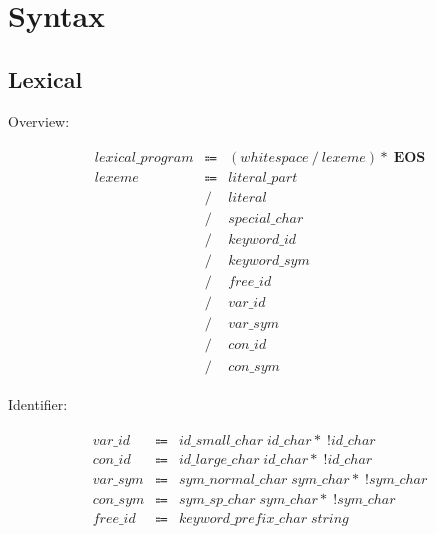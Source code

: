 \section{Syntax}

\subsection{Lexical}

Overview:

\begin{align*}
    \begin{array}{rcll}
        \mathit{lexical\_program}
        &\Coloneq &(\mathit{whitespace} \mathrel{/} \mathit{lexeme}){*}\; \mathbf{EOS} \\
        \mathit{lexeme}
        &\Coloneq &\mathit{literal\_part} \\
        &\mathrel{/} &\mathit{literal} \\
        &\mathrel{/} &\mathit{special\_char} \\
        &\mathrel{/} &\mathit{keyword\_id} \\
        &\mathrel{/} &\mathit{keyword\_sym} \\
        &\mathrel{/} &\mathit{free\_id} \\
        &\mathrel{/} &\mathit{var\_id} \\
        &\mathrel{/} &\mathit{var\_sym} \\
        &\mathrel{/} &\mathit{con\_id} \\
        &\mathrel{/} &\mathit{con\_sym}
    \end{array}
\end{align*}

Identifier:

\begin{align*}
    \begin{array}{rcll}
        \mathit{var\_id}
        &\Coloneq &\mathit{id\_small\_char}\; \mathit{id\_char}{*}\; \mathop{!} \mathit{id\_char} \\
        \mathit{con\_id}
        &\Coloneq &\mathit{id\_large\_char}\; \mathit{id\_char}{*}\; \mathop{!} \mathit{id\_char} \\
        \mathit{var\_sym}
        &\Coloneq &\mathit{sym\_normal\_char}\; \mathit{sym\_char}{*}\; \mathop{!} \mathit{sym\_char} \\
        \mathit{con\_sym}
        &\Coloneq &\mathit{sym\_sp\_char}\; \mathit{sym\_char}{*}\; \mathop{!} \mathit{sym\_char} \\
        \mathit{free\_id}
        &\Coloneq &\mathit{keyword\_prefix\_char}\; \mathit{string}
    \end{array}
\end{align*}


